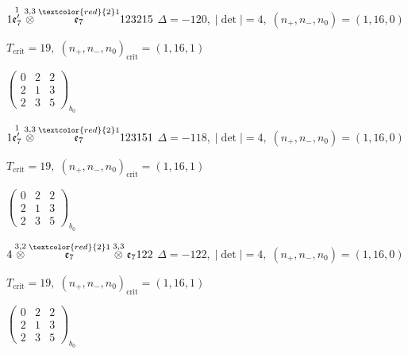 \documentclass[10pt]{article}
\begin{document}
\smallskip

$1\overset{1}{\mathfrak{e}_7'}\overset{3,3}{\otimes}\overset{\textcolor{red}{2}1}{\mathfrak{e}_7}123215$ \quad $\Delta=-120,\; |\det|=4,\; (n_+,n_-,n_0)=(1,16,0)$

\hspace{1em}$T_{\text{crit}}=19,\; (n_+,n_-,n_0)_{\text{crit}}=(1,16,1)$

\hspace{2em}$\left(\begin{smallmatrix}0 & 2 & 2 \\ 2 & 1 & 3 \\ 2 & 3 & 5\end{smallmatrix}\right)_{\!b_0}$

\smallskip

$1\overset{1}{\mathfrak{e}_7'}\overset{3,3}{\otimes}\overset{\textcolor{red}{2}1}{\mathfrak{e}_7}123151$ \quad $\Delta=-118,\; |\det|=4,\; (n_+,n_-,n_0)=(1,16,0)$

\hspace{1em}$T_{\text{crit}}=19,\; (n_+,n_-,n_0)_{\text{crit}}=(1,16,1)$

\hspace{2em}$\left(\begin{smallmatrix}0 & 2 & 2 \\ 2 & 1 & 3 \\ 2 & 3 & 5\end{smallmatrix}\right)_{\!b_0}$

\smallskip

$4\overset{3,2}{\otimes}\overset{\textcolor{red}{2}1}{\mathfrak{e}_7}\overset{3,3}{\otimes}\mathfrak{e}_7122$ \quad $\Delta=-122,\; |\det|=4,\; (n_+,n_-,n_0)=(1,16,0)$

\hspace{1em}$T_{\text{crit}}=19,\; (n_+,n_-,n_0)_{\text{crit}}=(1,16,1)$

\hspace{2em}$\left(\begin{smallmatrix}0 & 2 & 2 \\ 2 & 1 & 3 \\ 2 & 3 & 5\end{smallmatrix}\right)_{\!b_0}$
\end{document}

